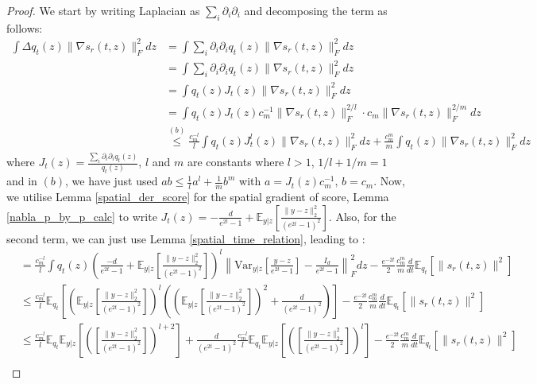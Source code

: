 \documentclass{article}
\begin{document}
\begin{proof}
    We start by writing Laplacian as $\sum_{i}\partial_i\partial_i$ and decomposing the term as follows:
    \begin{align*}
     \int  \Delta q_t(z) \|\nabla s_r(t,z)\|^2_F dz &= \int  \sum_i \partial_i\partial_i q_t(z) \|\nabla s_r(t,z)\|^2_F dz \\
      &= \int  \sum_i \partial_i\partial_i q_t(z) \|\nabla s_r(t,z)\|^2_F dz \\
      &= \int   q_t(z) J_t(z) \|\nabla s_r(t,z)\|^2_F dz  \\
      &= \int   q_t(z) J_t(z) c_m^{-1}\|\nabla s_r(t,z)\|^{2/l}_F \cdot c_m \|\nabla s_r(t,z)\|^{2/m}_F  dz \\
      &\overset{(b)}{\leq}  \frac{c_m^{-l}}{l}\int   q_t(z) J^l_t(z)\|\nabla s_r(t,z)\|^{2}_F dz + \frac{c^m_m}{m}\int q_t(z) \|\nabla s_r(t,z)\|^{2}_F  dz 
    \end{align*}
    where $J_t(z) = \frac{\sum_i\partial_i\partial_i q_t(z)}{q_t(z)}$, $l$ and $m$ are constants where $l>1$, $1/l+1/m=1$ and in $(b)$, we have just used $ab \leq \frac{1}{l}a^l + \frac{1}{m}b^m$ with $a = J_t(z)c^{-1}_m, \, b=c_m$. Now, we utilise Lemma \ref{spatial_der_score} for the spatial gradient of score, Lemma \ref{nabla_p_by_p_calc} to write $J_t(z) = -\frac{d}{e^{2t}-1} + \mathbb{E}_{y|z}\left[ \frac{\|y-z\|^2_2}{(e^{2t}-1)^2}\right]$. Also, for the second term, we can just use Lemma \ref{spatial_time_relation}, leading to :
    \begin{align*}
       &=\frac{c_m^{-l}}{l}\int   q_t(z) \left(\frac{-d}{e^{2t}-1} + \mathbb{E}_{y|z} \left[\frac{\|y-z\|_2^2}{(e^{2t}-1)^2}\right]\right)^l\left\|\text{Var}_{y|z}\left[\frac{y-z}{e^{2t}-1}\right] - \frac{I_d}{e^{2t}-1}\right\|^2_F dz -\frac{e^{-2t}}{2} \frac{c^m_m}{m}\frac{d}{dt}\mathbb{E}_{q_t}[\|s_r(t,z)\|^2] \\
       &\leq\frac{c_m^{-l}}{l}\mathbb{E}_{q_t} \left[\left( \mathbb{E}_{y|z} \left[\frac{\|y-z\|_2^2}{(e^{2t}-1)^2}\right]\right)^l\left(\left(\mathbb{E}_{y|z}\left[\frac{\|y-z\|^2_2}{(e^{2t}-1)^2}\right]\right)^2 +\frac{d}{(e^{2t}-1)^2}\right) \right]  -\frac{e^{-2t}}{2} \frac{c^m_m}{m}\frac{d}{dt}\mathbb{E}_{q_t}[\|s_r(t,z)\|^2] \\
       &\leq\frac{c_m^{-l}}{l}\mathbb{E}_{q_t} \mathbb{E}_{y|z}\left[\left(  \left[\frac{\|y-z\|_2^2}{(e^{2t}-1)^2}\right]\right)^{l+2} \right] + \frac{d}{(e^{2t}-1)^2}\frac{c_m^{-l}}{l}\mathbb{E}_{q_t} \mathbb{E}_{y|z}\left[\left(  \left[\frac{\|y-z\|_2^2}{(e^{2t}-1)^2}\right]\right)^{l} \right]  -\frac{e^{-2t}}{2} \frac{c^m_m}{m}\frac{d}{dt}\mathbb{E}_{q_t}[\|s_r(t,z)\|^2]   \tag{Jensen's Inequality}\\

\end{align*}
\end{proof}
\end{document}
